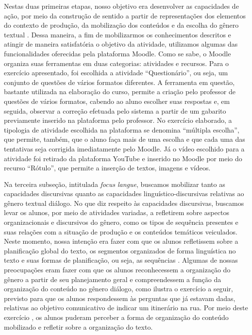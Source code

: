 Nestas duas primeiras etapas, nosso objetivo era desenvolver as
capacidades de ação, por meio da construção de sentido a partir de
representações dos elementos do contexto de produção, da mobilização dos
conteúdos e da escolha do gênero textual \cite{bronckart_atividade_1999}. Dessa
maneira, a fim de mobilizarmos os conhecimentos descritos e atingir de
maneira satisfatória o objetivo da atividade, utilizamos algumas das
funcionalidades oferecidas pela plataforma Moodle. Como se sabe, o
Moodle organiza suas ferramentas em duas categorias: atividades e
recursos. Para o exercício apresentado, foi escolhida a atividade
\enquote{Questionário}, ou seja, um conjunto de questões de vários formatos
diferentes. A ferramenta em questão, bastante utilizada na elaboração do
curso, permite a criação pelo professor de questões de vários formatos,
cabendo ao aluno escolher suas respostas e, em seguida, observar a
correção efetuada pelo sistema a partir de um gabarito previamente
inserido na plataforma pelo professor. No exercício elaborado, a
tipologia de atividade escolhida na plataforma se denomina \enquote{múltipla
escolha}, que permite, também, que o aluno faça mais de uma escolha e
que cada uma das tentativas seja corrigida imediatamente pelo Moodle. Já
o vídeo escolhido para a atividade foi retirado da plataforma YouTube e
inserido no Moodle por meio do recurso \enquote{Rótulo}, que permite a
inserção de textos, imagens e vídeos.

Na terceira subseção, intitulada \emph{focus langue}, buscamos mobilizar
tanto as capacidades discursivas quanto as capacidades
linguístico-discursivas relativas ao gênero textual diálogo. No que diz
respeito às capacidades discursivas, buscamos levar os alunos, por meio
de atividades variadas, a refletirem sobre aspectos organizacionais e
discursivos do gênero, como os tipos de sequência presentes e suas
relações com a situação de produção e os conteúdos temáticos veiculados.
Neste momento, nossa intenção era fazer com que os alunos refletissem
sobre a planificação global do texto, os segmentos organizados de forma
linguística no texto e suas formas de planificação, ou seja, as
sequências \cite{adam_1992,bronckart_atividade_1999}. Algumas de nossas preocupações eram fazer com que os alunos reconhecessem a organização do gênero a partir de seu planejamento geral e compreendessem a função da
organização do conteúdo no gênero diálogo, como ilustra o exercício a
seguir, previsto para que os alunos respondessem às perguntas que já
estavam dadas, relativas ao objetivo comunicativo de indicar um
itinerário na rua. Por meio deste exercício , os alunos
puderam perceber a forma de organização do conteúdo mobilizado e
refletir sobre a organização do texto.


